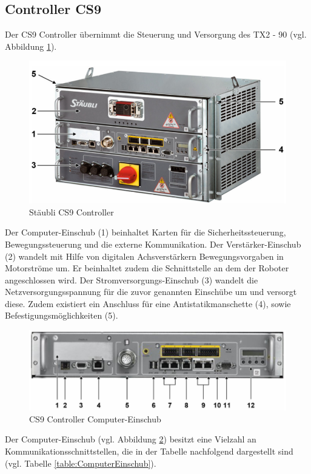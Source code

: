 \documentclass[ a4paper,
                oneside,
                toc=bibliography,
                toc=listof
                ]{scrbook}
\begin{document}
   	\subsection{Controller CS9}
   	Der CS9 Controller übernimmt die Steuerung und Versorgung des TX2 - 90 (vgl. Abbildung \ref{fig:CS9}).
   	\begin{figure}[!ht]
   		\centering
   		\includegraphics[width=0.70\linewidth]{./images/CS9.png}
   		\caption{Stäubli CS9 Controller \cite{CS9}} 
   		\label{fig:CS9}
   	\end{figure}
   	Der Computer-Einschub (1) beinhaltet Karten für die Sicherheitssteuerung, Bewegungssteuerung und die externe Kommunikation. Der Verstärker-Einschub (2) wandelt mit Hilfe von digitalen Achsverstärkern Bewegungsvorgaben in Motorströme um. Er beinhaltet zudem die Schnittstelle an dem der Roboter angeschlossen wird. Der Stromversorgungs-Einschub (3) wandelt die Netzversorgungsspannung für die zuvor genannten Einschübe um und versorgt diese. Zudem existiert ein Anschluss für eine Antistatikmanschette (4), sowie Befestigungsmöglichkeiten (5).
   	\begin{figure}[!ht]
   		\centering
   		\includegraphics[width=0.70\linewidth]{./images/ComputerEinschub.png}
   		\caption{CS9 Controller Computer-Einschub \cite{CS9}} 
   		\label{fig:ComputerEinschub}
   	\end{figure}
   	Der Computer-Einschub (vgl. Abbildung \ref{fig:ComputerEinschub}) besitzt eine Vielzahl an Kommunikationsschnittstellen, die in der Tabelle nachfolgend dargestellt sind (vgl. Tabelle \ref{table:ComputerEinschub}).
\end{document}
